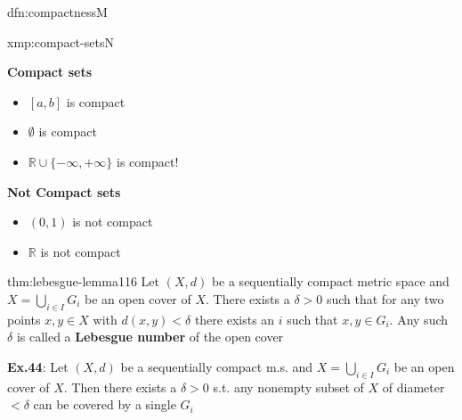 \documentclass[landscape, 8pt]{extarticle}
\begin{document}
\begin{multicols}{3}
\begin{dfn}{dfn:compactness}{M}
\end{dfn}

\begin{xmp}{xmp:compact-sets}{N}
    \vspace{-16pt}
    \setlength{\columnseprule}{0.5pt}
    \begin{multicols}{2}
        \textbf{Compact sets}
        \vspace{-5pt}
        \begin{itemize}[leftmargin=*]
            \item $[a, b]$ is compact
            \item $\emptyset$ is compact
            \item $\mathbb{R} \cup \{-\infty, +\infty\}$ is compact!
        \end{itemize}

        \textbf{Not Compact sets}
        \vspace{-5pt}
        \begin{itemize}[leftmargin=*]
            \item $(0, 1)$ is not compact
            \item $\mathbb{R}$ is not compact
        \end{itemize}
    \end{multicols}
    \vspace{-8pt}
\end{xmp}

\vspace{-6pt}
\begin{thm}{thm:lebesgue-lemma}{116}
    \vspace{-6pt}
    Let $(X, d)$ be a sequentially compact metric space and $X = \bigcup_{i\in I} G_{i}$ be an open cover of $X$. There exists a $\delta > 0$ such that for any two points $x, y\in X$ with $d(x, y) < \delta$ there exists an $i$ such that $x, y\in G_{i}$. Any such $\delta$ is called a \textbf{Lebesgue number} of the open cover

    \longrule{0.08ex}
    \textbf{Ex.44}: Let $(X, d)$ be a sequentially compact m.s. and $X = \bigcup_{i\in I} G_{i}$ be an open cover of $X$. Then there exists a $\delta > 0$ s.t. any nonempty subset of $X$ of diameter $< \delta$ can be covered by a single $G_{i}$
\end{thm}


\end{multicols}
\end{document}
